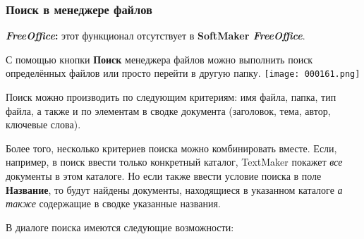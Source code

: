 ﻿\documentclass[a4paper,10pt]{article}
\begin{document}
\subsubsection{Поиск в менеджере файлов}
\begin{mdframed}[backgroundcolor=pink!50]
\textbf{\textit{FreeOffice}:} этот функционал отсутствует в \textbf{SoftMaker \textit{FreeOffice}}.
\end{mdframed}

С помощью кнопки \textbf{Поиск} менеджера файлов можно выполнить поиск определённых файлов или просто перейти в другую папку.
\newline
\newline
\texttt{[image: 000161.png]}

Поиск можно производить по следующим критериям: имя файла, папка, тип файла, а также и по элементам в сводке документа (заголовок, тема, автор, ключевые слова).

Более того, несколько критериев поиска можно комбинировать вместе. Если, например, в поиск ввести только конкретный каталог, TextMaker покажет \textit{все} документы в этом каталоге. Но если также ввести условие поиска в поле \textbf{Название}, то будут найдены документы, находящиеся в указанном каталоге \textit{а также} содержащие в сводке указанные названия.

В диалоге поиска имеются следующие возможности:
\end{document}
